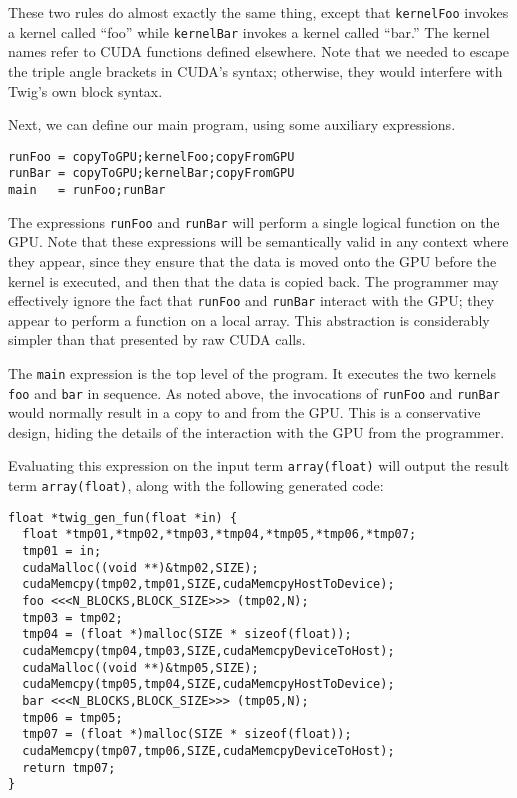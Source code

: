 These two rules do almost exactly the same thing, except that
\texttt{kernelFoo} invokes a kernel called ``foo'' while
\texttt{kernelBar} invokes a kernel called ``bar.'' The kernel
names refer to CUDA functions defined elsewhere. Note that we
needed to escape the triple angle brackets in CUDA's syntax;
otherwise, they would interfere with Twig's own block syntax.

Next, we can define our main program, using some auxiliary
expressions.

\begin{verbatim}
runFoo = copyToGPU;kernelFoo;copyFromGPU
runBar = copyToGPU;kernelBar;copyFromGPU
main   = runFoo;runBar
\end{verbatim}

The expressions \texttt{runFoo} and \texttt{runBar} will perform a
single logical function on the GPU. Note that these expressions
will be semantically valid in any context where they appear, since
they ensure that the data is moved onto the GPU before the kernel
is executed, and then that the data is copied back. The programmer
may effectively ignore the fact that \texttt{runFoo} and
\texttt{runBar} interact with the GPU; they appear to perform a
function on a local array. This abstraction is considerably
simpler than that presented by raw CUDA calls.

The \texttt{main} expression is the top level of the program. It
executes the two kernels \texttt{foo} and \texttt{bar} in
sequence. As noted above, the invocations of \texttt{runFoo} and
\texttt{runBar} would normally result in a copy to and from the
GPU. This is a conservative design, hiding the details of the
interaction with the GPU from the programmer. 

Evaluating this expression on the input term \texttt{array(float)}
will output the result term \texttt{array(float)}, along with the
following generated code:

\begin{verbatim}
float *twig_gen_fun(float *in) {
  float *tmp01,*tmp02,*tmp03,*tmp04,*tmp05,*tmp06,*tmp07;
  tmp01 = in;
  cudaMalloc((void **)&tmp02,SIZE);
  cudaMemcpy(tmp02,tmp01,SIZE,cudaMemcpyHostToDevice);
  foo <<<N_BLOCKS,BLOCK_SIZE>>> (tmp02,N);
  tmp03 = tmp02;
  tmp04 = (float *)malloc(SIZE * sizeof(float));
  cudaMemcpy(tmp04,tmp03,SIZE,cudaMemcpyDeviceToHost);
  cudaMalloc((void **)&tmp05,SIZE);
  cudaMemcpy(tmp05,tmp04,SIZE,cudaMemcpyHostToDevice);
  bar <<<N_BLOCKS,BLOCK_SIZE>>> (tmp05,N);
  tmp06 = tmp05;
  tmp07 = (float *)malloc(SIZE * sizeof(float));
  cudaMemcpy(tmp07,tmp06,SIZE,cudaMemcpyDeviceToHost);
  return tmp07;
}\end{verbatim}

